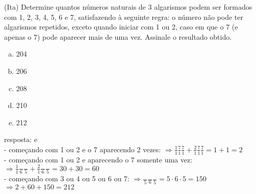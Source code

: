 \begin{ex}
(Ita) Determine quantos números naturais de 3 algarismos podem ser formados com 1, 2, 3, 4, 5, 6 e 7, satisfazendo à seguinte regra: o número não pode ter algarismos repetidos, exceto quando iniciar com 1 ou 2, caso em que o 7 (e apenas o 7) pode aparecer mais de uma vez. Assinale o resultado obtido.
   \begin{enumerate}[(a)]
   \item 204
   \item 206
   \item 208
   \item 210
   \item 212
   \end{enumerate}
    \begin{sol}
     resposta: e \\
     - começando com 1 ou 2 e o  7 aparecendo 2 vezes:
     $\Rightarrow \frac{1}{1}\frac{7}{1}\frac{7}{1}+\frac{2}{1}\frac{7}{1}\frac{7}{1}= 1+1=2$
     \\
     - começando com 1 ou 2 e aparecendo o 7 somente uma vez: 
     $\Rightarrow \frac{1}{1}\frac{\phantom{A}}{6}\frac{\phantom{A}}{5}+\frac{2}{1}\frac{\phantom{A}}{6}\frac{\phantom{A}}{5}=30+30=60$\\
     - começando com 3 ou 4 ou 5 ou 6 ou 7: 
     $\Rightarrow \frac{\phantom{A}}{5}\frac{\phantom{A}}{6}\frac{\phantom{A}}{5}=5\cdot6\cdot5=150$ \\
     $\Longrightarrow 2+60+150=212$
    \end{sol}
\end{ex}